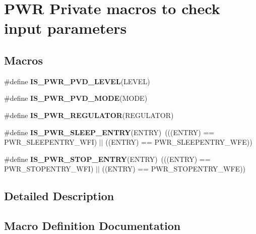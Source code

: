 \hypertarget{group___p_w_r___i_s___p_w_r___definitions}{}\section{P\+WR Private macros to check input parameters}
\label{group___p_w_r___i_s___p_w_r___definitions}
\subsection*{Macros}
\begin{DoxyCompactItemize}
\item 
\#define {\bfseries I\+S\+\_\+\+P\+W\+R\+\_\+\+P\+V\+D\+\_\+\+L\+E\+V\+EL}(L\+E\+V\+EL)
\item 
\#define {\bfseries I\+S\+\_\+\+P\+W\+R\+\_\+\+P\+V\+D\+\_\+\+M\+O\+DE}(M\+O\+DE)
\item 
\#define {\bfseries I\+S\+\_\+\+P\+W\+R\+\_\+\+R\+E\+G\+U\+L\+A\+T\+OR}(R\+E\+G\+U\+L\+A\+T\+OR)
\item 
\#define {\bfseries I\+S\+\_\+\+P\+W\+R\+\_\+\+S\+L\+E\+E\+P\+\_\+\+E\+N\+T\+RY}(E\+N\+T\+RY)~(((E\+N\+T\+RY) == P\+W\+R\+\_\+\+S\+L\+E\+E\+P\+E\+N\+T\+R\+Y\+\_\+\+W\+FI) $\vert$$\vert$ ((E\+N\+T\+RY) == P\+W\+R\+\_\+\+S\+L\+E\+E\+P\+E\+N\+T\+R\+Y\+\_\+\+W\+FE))\hypertarget{group___p_w_r___i_s___p_w_r___definitions_ga9b36a9c213a77d36340788b2e7e277ff}{}\label{group___p_w_r___i_s___p_w_r___definitions_ga9b36a9c213a77d36340788b2e7e277ff}

\item 
\#define {\bfseries I\+S\+\_\+\+P\+W\+R\+\_\+\+S\+T\+O\+P\+\_\+\+E\+N\+T\+RY}(E\+N\+T\+RY)~(((E\+N\+T\+RY) == P\+W\+R\+\_\+\+S\+T\+O\+P\+E\+N\+T\+R\+Y\+\_\+\+W\+FI) $\vert$$\vert$ ((E\+N\+T\+RY) == P\+W\+R\+\_\+\+S\+T\+O\+P\+E\+N\+T\+R\+Y\+\_\+\+W\+FE))\hypertarget{group___p_w_r___i_s___p_w_r___definitions_ga4a94eb1f400dec6e486fbc229cbea8a0}{}\label{group___p_w_r___i_s___p_w_r___definitions_ga4a94eb1f400dec6e486fbc229cbea8a0}

\end{DoxyCompactItemize}


\subsection{Detailed Description}


\subsection{Macro Definition Documentation}
